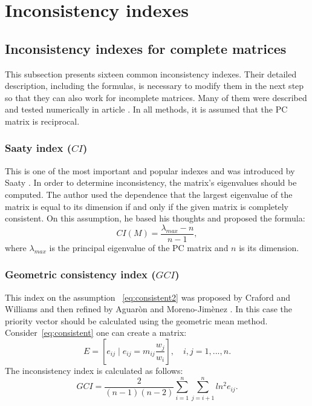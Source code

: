 \chapter{Inconsistency indexes}
\label{sec:inconsistencyIndexes}
\section{Inconsistency indexes for complete matrices}

This subsection presents sixteen common inconsistency indexes. Their detailed description, including the formulas, is necessary to modify them in the next step so that they can also work for incomplete matrices. Many of them were described and tested numerically in article \cite{Brunelli2013}. In all methods, it is assumed that the PC matrix is reciprocal.


 \subsection{Saaty index ($CI$)}

This is one of the most important and popular indexes and was introduced by Saaty \cite{SAATY1977}. In order to determine inconsistency, the matrix's eigenvalues should be computed. The author used the dependence that the largest eigenvalue of the matrix is equal to its dimension if and only if the given matrix is completely consistent. On this assumption, he based his thoughts and proposed the formula:
	\begin{equation} 
		CI(M)=\frac{\lambda_{max}-n}{n-1},
	 \end{equation}
 where $\lambda_{max}$
  is the principal eigenvalue of the PC matrix and $n$
  is its dimension.


\subsection{Geometric consistency index ($GCI$)}

This index on the assumption ~\ref{eq:consistent2} was proposed by Craford and Williams \cite{CRAWFORD1985} and then refined by Aguaròn and Moreno-Jimènez \cite{AGUARON2003}. In this case the priority vector should be calculated using the geometric mean method. Consider~\ref{eq:consistent} one can create a matrix:
	\begin{equation} 
		E=\left[e_{ij}\mid e_{ij}=m_{ij}\frac{w_{j}}{w_{i}}\right],\,\,\,\,\,\,i,j=1,...,n.
	 \end{equation}
 The inconsistency index is calculated as follows:
	 \begin{equation} 
		\label{eq:GCI}
		GCI=\frac{2}{(n-1)(n-2)}\sum_{i=1}^{n}\sum_{j=i+1}^{n}ln^{2}e_{ij}.
	 \end{equation}
 

